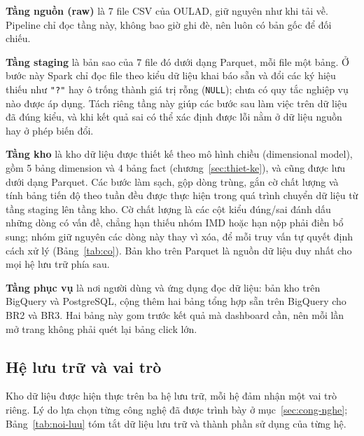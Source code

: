 \textbf{Tầng nguồn (raw)} là 7 file CSV của OULAD, giữ nguyên như khi tải về. Pipeline chỉ
đọc tầng này, không bao giờ ghi đè, nên luôn có bản gốc để đối chiếu.

\textbf{Tầng staging} là bản sao của 7 file đó dưới dạng Parquet, mỗi file một bảng. Ở
bước này Spark chỉ đọc file theo kiểu dữ liệu khai báo sẵn và đổi các ký hiệu thiếu như
\texttt{"?"} hay ô trống thành giá trị rỗng (\texttt{NULL}); chưa có quy tắc nghiệp vụ nào
được áp dụng. Tách riêng tầng này giúp các bước sau làm việc trên dữ liệu đã đúng kiểu,
và khi kết quả sai có thể xác định được lỗi nằm ở dữ liệu nguồn hay ở phép biến đổi.

\textbf{Tầng kho} là kho dữ liệu được thiết kế theo mô hình chiều (dimensional model), gồm 5 bảng dimension và 4 bảng fact (chương~\ref{sec:thiet-ke}), và cũng được lưu dưới dạng Parquet. Các bước làm sạch, gộp dòng trùng, gắn cờ chất lượng và tính bảng tiến độ theo tuần đều được thực hiện trong quá trình chuyển dữ liệu từ tầng staging lên tầng kho. Cờ chất lượng là các cột kiểu đúng/sai đánh dấu những dòng có vấn đề, chẳng hạn thiếu nhóm IMD hoặc hạn nộp phải điền bổ sung; nhóm giữ nguyên các dòng này thay vì xóa, để mỗi truy vấn tự quyết định cách xử lý (Bảng~\ref{tab:co}). Bản kho trên Parquet là nguồn dữ liệu duy nhất cho mọi hệ lưu trữ phía sau.

\textbf{Tầng phục vụ} là nơi người dùng và ứng dụng đọc dữ liệu: bản kho trên BigQuery và
PostgreSQL, cộng thêm hai bảng tổng hợp sẵn trên BigQuery cho BR2 và BR3. Hai bảng này gom
trước kết quả mà dashboard cần, nên mỗi lần mở trang không phải quét lại bảng click lớn.

\subsection{Hệ lưu trữ và vai trò}
\label{sec:noi-luu}

Kho dữ liệu được hiện thực trên ba hệ lưu trữ, mỗi hệ đảm nhận một vai trò riêng. Lý do lựa
chọn từng công nghệ đã được trình bày ở mục~\ref{sec:cong-nghe};
Bảng~\ref{tab:noi-luu} tóm tắt dữ liệu lưu trữ và thành phần sử dụng của từng hệ.

